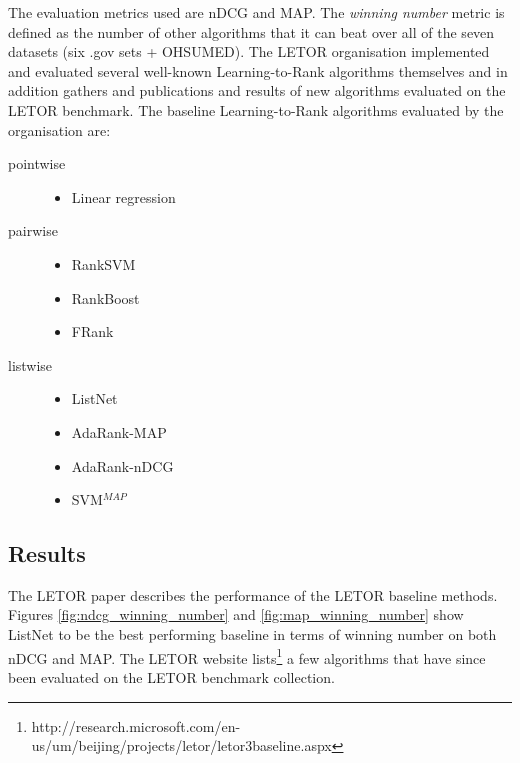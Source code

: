 The evaluation metrics used are \ac{nDCG} and \ac{MAP}. The \emph{winning number} metric is defined as the number of other algorithms that it can beat over all of the seven datasets (six .gov sets + OHSUMED). The LETOR organisation implemented and evaluated several well-known Learning-to-Rank algorithms themselves and in addition gathers and publications and results of new algorithms evaluated on the LETOR benchmark. The baseline Learning-to-Rank algorithms evaluated by the organisation are:
\begin{description}
\item[pointwise]{\leavevmode
	\begin{itemize}
	\item Linear regression
	\end{itemize}}
\item[pairwise]{\leavevmode
	\begin{itemize}
	\item Rank\ac{SVM} \cite{Herbrich1999,Joachims2002}
	\item RankBoost \cite{Freund2003}
	\item FRank \cite{Tsai2007}
	\end{itemize}}
\item[listwise]{\leavevmode
	\begin{itemize}
	\item ListNet \cite{Cao2007}
	\item AdaRank-MAP \cite{Xu2007}
	\item AdaRank-nDCG \cite{Xu2007}
	\item \ac{SVM}$^{MAP}$ \cite{Yue2007} 
	\end{itemize}}
\end{description} 


\subsection{Results}
The LETOR paper \cite{Qin2010} describes the performance of the LETOR baseline methods. Figures \ref{fig:ndcg_winning_number} and \ref{fig:map_winning_number} show ListNet to be the best performing baseline in terms of winning number on both \ac{nDCG} and \ac{MAP}. The LETOR website lists\footnote{http://research.microsoft.com/en-us/um/beijing/projects/letor/letor3baseline.aspx} a few algorithms that have since been evaluated on the LETOR benchmark collection.\\

